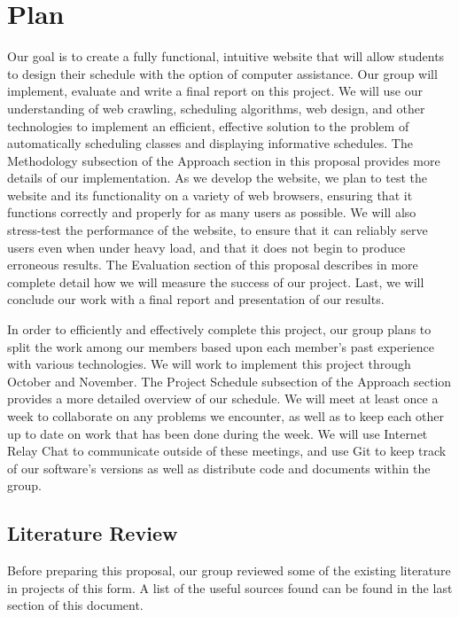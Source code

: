 \section{Plan}
Our goal is to create a fully functional, intuitive website that will allow students to design their 
schedule with the option of computer assistance. Our group will implement, evaluate and write a final
report on this project. We will use our understanding of web crawling, scheduling algorithms, web design,
and other technologies to implement an efficient, effective solution to the problem of automatically
scheduling classes and displaying informative schedules. The Methodology subsection 
of the Approach section in this proposal provides more details of our implementation.
As we develop the website, we plan to test the website and its functionality on a variety
of web browsers, ensuring that it functions correctly and properly for as many users as possible.
We will also stress-test the performance of the website, to ensure that it can reliably serve
users even when under heavy load, and that it does not begin to produce erroneous results.
The Evaluation section of this proposal describes in more complete detail how we will measure
the success of our project. Last, we will conclude our work with a final report and presentation of our results.

In order to efficiently and effectively complete this project, our group plans to split the work among
our members based upon each member's past experience with various technologies. We will work
to implement this project through October and November. The Project Schedule subsection 
of the Approach section provides a more detailed overview of our schedule.
We will meet at least once a week to collaborate on any problems we encounter, as well
as to keep each other up to date on work that has been done during the week. We will
use Internet Relay Chat to communicate outside of these meetings, and use Git to
keep track of our software's versions as well as distribute code and documents within
the group.

\subsection{Literature Review}

Before preparing this proposal, our group reviewed some of the existing literature in projects of this form.
A list of the useful sources found can be found in the last section of this document.

